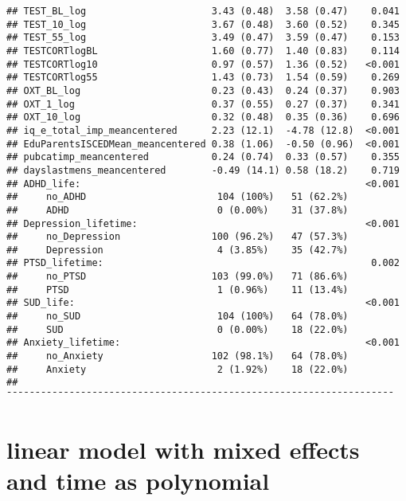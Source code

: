 \documentclass[
]{article}
\begin{document}
\begin{verbatim}
## TEST_BL_log                      3.43 (0.48)  3.58 (0.47)    0.041   
## TEST_10_log                      3.67 (0.48)  3.60 (0.52)    0.345   
## TEST_55_log                      3.49 (0.47)  3.59 (0.47)    0.153   
## TESTCORTlogBL                    1.60 (0.77)  1.40 (0.83)    0.114   
## TESTCORTlog10                    0.97 (0.57)  1.36 (0.52)   <0.001   
## TESTCORTlog55                    1.43 (0.73)  1.54 (0.59)    0.269   
## OXT_BL_log                       0.23 (0.43)  0.24 (0.37)    0.903   
## OXT_1_log                        0.37 (0.55)  0.27 (0.37)    0.341   
## OXT_10_log                       0.32 (0.48)  0.35 (0.36)    0.696   
## iq_e_total_imp_meancentered      2.23 (12.1)  -4.78 (12.8)  <0.001   
## EduParentsISCEDMean_meancentered 0.38 (1.06)  -0.50 (0.96)  <0.001   
## pubcatimp_meancentered           0.24 (0.74)  0.33 (0.57)    0.355   
## dayslastmens_meancentered        -0.49 (14.1) 0.58 (18.2)    0.719   
## ADHD_life:                                                  <0.001   
##     no_ADHD                       104 (100%)   51 (62.2%)            
##     ADHD                          0 (0.00%)    31 (37.8%)            
## Depression_lifetime:                                        <0.001   
##     no_Depression                100 (96.2%)   47 (57.3%)            
##     Depression                    4 (3.85%)    35 (42.7%)            
## PTSD_lifetime:                                               0.002   
##     no_PTSD                      103 (99.0%)   71 (86.6%)            
##     PTSD                          1 (0.96%)    11 (13.4%)            
## SUD_life:                                                   <0.001   
##     no_SUD                        104 (100%)   64 (78.0%)            
##     SUD                           0 (0.00%)    18 (22.0%)            
## Anxiety_lifetime:                                           <0.001   
##     no_Anxiety                   102 (98.1%)   64 (78.0%)            
##     Anxiety                       2 (1.92%)    18 (22.0%)            
## ¯¯¯¯¯¯¯¯¯¯¯¯¯¯¯¯¯¯¯¯¯¯¯¯¯¯¯¯¯¯¯¯¯¯¯¯¯¯¯¯¯¯¯¯¯¯¯¯¯¯¯¯¯¯¯¯¯¯¯¯¯¯¯¯¯¯¯¯
\end{verbatim}

\hypertarget{linear-model-with-mixed-effects-and-time-as-polynomial}{%
\section{linear model with mixed effects and time as
polynomial}\label{linear-model-with-mixed-effects-and-time-as-polynomial}}
\end{document}
